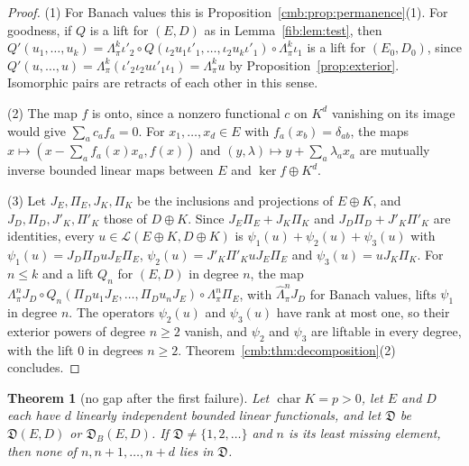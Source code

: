 \documentclass[11pt]{amsart}
\newtheorem{theorem}{Theorem}[section]
\theoremstyle{definition}
\theoremstyle{remark}
\numberwithin{equation}{section}
\newcommand{\cL}{\mathcal L}
\theoremstyle{plain}
\theoremstyle{definition}
\theoremstyle{plain}
\newcommand{\fD}{\mathfrak D}
\begin{document}
\begin{proof}
(1) For Banach values this is Proposition~\ref{cmb:prop:permanence}(1). For goodness, if $Q$ is a lift for $(E,D)$ as in
Lemma~\ref{fib:lem:test}, then
$Q'(u_1,\dots,u_k)=\Lambda^k_\pi\iota'_2\circ Q(\iota_2u_1\iota'_1,\dots,\iota_2u_k\iota'_1)\circ\Lambda^k_\pi\iota_1$ is a
lift for $(E_0,D_0)$, since $Q'(u,\dots,u)=\Lambda^k_\pi(\iota'_2\iota_2u\iota'_1\iota_1)=\Lambda^k_\pi u$ by
Proposition~\ref{prop:exterior}. Isomorphic pairs are retracts of each other in this sense.

(2) The map $f$ is onto, since a nonzero functional $c$ on $K^d$ vanishing on its image would give $\sum_ac_af_a=0$. For
$x_1,\dots,x_d\in E$ with $f_a(x_b)=\delta_{ab}$, the maps $x\mapsto(x-\sum_af_a(x)x_a,f(x))$ and
$(y,\lambda)\mapsto y+\sum_a\lambda_ax_a$ are mutually inverse bounded linear maps between $E$ and $\ker f\oplus K^d$.

(3) Let $J_E,\Pi_E,J_K,\Pi_K$ be the inclusions and projections of $E\oplus K$, and $J_D,\Pi_D,J'_K,\Pi'_K$ those of
$D\oplus K$. Since $J_E\Pi_E+J_K\Pi_K$ and $J_D\Pi_D+J'_K\Pi'_K$ are identities, every
$u\in\cL(E\oplus K,D\oplus K)$ is $\psi_1(u)+\psi_2(u)+\psi_3(u)$ with $\psi_1(u)=J_D\Pi_DuJ_E\Pi_E$,
$\psi_2(u)=J'_K\Pi'_KuJ_E\Pi_E$ and $\psi_3(u)=uJ_K\Pi_K$. For $n\le k$ and a lift $Q_n$ for $(E,D)$ in degree $n$, the map
$\Lambda^n_\pi J_D\circ Q_n(\Pi_Du_1J_E,\dots,\Pi_Du_nJ_E)\circ\Lambda^n_\pi\Pi_E$, with $\widehat\Lambda^n_\pi J_D$ for
Banach values, lifts $\psi_1$ in degree $n$. The operators $\psi_2(u)$ and $\psi_3(u)$ have rank at most one, so their exterior
powers of degree $n\ge2$ vanish, and $\psi_2$ and $\psi_3$ are liftable in every degree, with the lift $0$ in degrees $n\ge2$. Theorem~\ref{cmb:thm:decomposition}(2)
concludes.
\end{proof}

\begin{theorem}[no gap after the first failure]\label{dgr:thm:gap}
Let $\operatorname{char}K=p>0$, let $E$ and $D$ each have $d$ linearly independent bounded linear functionals, and let
$\fD$ be $\fD(E,D)$ or $\fD_B(E,D)$. If $\fD\ne\{1,2,\dots\}$ and $n$ is its least missing element, then none of
$n,n+1,\dots,n+d$ lies in $\fD$.
\end{theorem}
\end{document}
